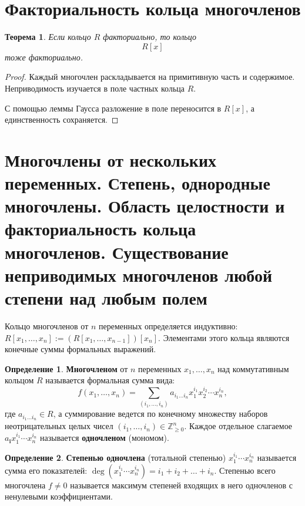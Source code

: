 \documentclass[12pt, a4paper]{article}
\newtheorem{theorem}{Теорема}
\theoremstyle{definition}
\newtheorem{definition}{Определение}
\theoremstyle{remark}
\begin{document}
\section{Факториальность кольца многочленов}

\begin{theorem}
	Если кольцо $R$ факториально, то кольцо
	\[
	R[x]
	\]
	тоже факториально.
\end{theorem}

\begin{proof}
	Каждый многочлен раскладывается на примитивную часть и содержимое.
	Неприводимость изучается в поле частных кольца $R$.
	
	С помощью леммы Гаусса разложение в поле переносится в $R[x]$, а
	единственность сохраняется.
\end{proof}

\section{Многочлены от нескольких переменных. Степень, однородные многочлены. Область целостности и факториальность кольца многочленов. Существование неприводимых многочленов любой степени над любым полем}

Кольцо многочленов от $n$ переменных определяется индуктивно: $R[x_1, \dots, x_n] := (R[x_1, \dots, x_{n-1}])[x_n]$. Элементами этого кольца являются конечные суммы формальных выражений.

\begin{definition}
	\textbf{Многочленом} от $n$ переменных $x_1, \dots, x_n$ над коммутативным кольцом $R$ называется формальная сумма вида:
	\[
	f(x_1, \dots, x_n) = \sum_{(i_1, \dots, i_n)} a_{i_1 \dots i_n} x_1^{i_1} x_2^{i_2} \cdots x_n^{i_n},
	\]
	где $a_{i_1 \dots i_n} \in R$, а суммирование ведется по конечному множеству наборов неотрицательных целых чисел $(i_1, \dots, i_n) \in \mathbb{Z}_{\ge 0}^n$. Каждое отдельное слагаемое $a_{\mathbf{i}} x_1^{i_1} \cdots x_n^{i_n}$ называется \textbf{одночленом} (мономом).
\end{definition}

\begin{definition}
	\textbf{Степенью одночлена} (тотальной степенью) $x_1^{i_1} \cdots x_n^{i_n}$ называется сумма его показателей: $\deg(x_1^{i_1} \cdots x_n^{i_n}) = i_1 + i_2 + \dots + i_n$. Степенью всего многочлена $f \neq 0$ называется максимум степеней входящих в него одночленов с ненулевыми коэффициентами.
\end{definition}
\end{document}
